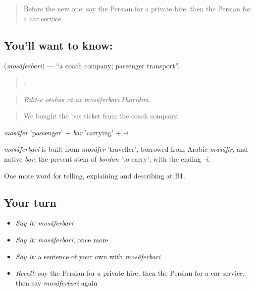 \begin{quote}
Before the new one: say the Persian for a private hire, then the Persian for a car service.
\end{quote}

\subsection*{You'll want to know: }
\textbf{} (\emph{mosâferbari}) — \textquotedblleft{}a coach company; passenger transport\textquotedblright{}.

\begin{quote}
     .
\end{quote}

\begin{quote}
\emph{Bilit-e otobus râ az mosâferbari kharidim.}
\end{quote}

\begin{quote}
We bought the bus ticket from the coach company.
\end{quote}

\emph{mosâfer} 'passenger' + \emph{bar} 'carrying' + \emph{-i}.

\begin{cousinweb}
\emph{mosâferbari} is built from \emph{mosâfer} 'traveller', borrowed from Arabic \emph{musāfir}, and native \emph{bar}, the present stem of \emph{bordan} 'to carry', with the ending \emph{-i}.
\end{cousinweb}

\begin{grammarlens}[title={What you've built}]
One more word for telling, explaining and describing at B1.
\end{grammarlens}

\subsection*{Your turn}
\begin{itemize}
\raggedright
  \item \emph{Say it:} \emph{mosâferbari}
  \item \emph{Say it:} \emph{mosâferbari}, once more
  \item \emph{Say it:} a sentence of your own with \emph{mosâferbari}
  \item \emph{Recall:} say the Persian for a private hire, then the Persian for a car service, then say \emph{mosâferbari} again
\end{itemize}

